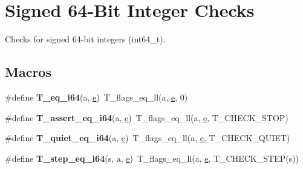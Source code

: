 \hypertarget{group__RTEMSTestFrameworkChecksInt64}{}\section{Signed 64-\/Bit Integer Checks}
\label{group__RTEMSTestFrameworkChecksInt64}


Checks for signed 64-\/bit integers (int64\+\_\+t).  


\subsection*{Macros}
\begin{DoxyCompactItemize}
\item 
\mbox{\label{group__RTEMSTestFrameworkChecksInt64_ga8e664405a7d427a48e6a8df2e3e1a8a1}} 
\#define {\bfseries T\+\_\+eq\+\_\+i64}(a,  \mbox{\hyperlink{sun4u_2tte_8h_a8b0b9ed08e0e18920ec2682f48228c27}{e}})~T\+\_\+flags\+\_\+eq\+\_\+ll(a, \mbox{\hyperlink{sun4u_2tte_8h_a8b0b9ed08e0e18920ec2682f48228c27}{e}}, 0)
\item 
\mbox{\label{group__RTEMSTestFrameworkChecksInt64_ga5d4dc5d93b1cda05c3acf35b4d244d06}} 
\#define {\bfseries T\+\_\+assert\+\_\+eq\+\_\+i64}(a,  \mbox{\hyperlink{sun4u_2tte_8h_a8b0b9ed08e0e18920ec2682f48228c27}{e}})~T\+\_\+flags\+\_\+eq\+\_\+ll(a, \mbox{\hyperlink{sun4u_2tte_8h_a8b0b9ed08e0e18920ec2682f48228c27}{e}}, T\+\_\+\+C\+H\+E\+C\+K\+\_\+\+S\+T\+OP)
\item 
\mbox{\label{group__RTEMSTestFrameworkChecksInt64_ga30e8b3d813466a529e6a0a4e9cb3610b}} 
\#define {\bfseries T\+\_\+quiet\+\_\+eq\+\_\+i64}(a,  \mbox{\hyperlink{sun4u_2tte_8h_a8b0b9ed08e0e18920ec2682f48228c27}{e}})~T\+\_\+flags\+\_\+eq\+\_\+ll(a, \mbox{\hyperlink{sun4u_2tte_8h_a8b0b9ed08e0e18920ec2682f48228c27}{e}}, T\+\_\+\+C\+H\+E\+C\+K\+\_\+\+Q\+U\+I\+ET)
\item 
\mbox{\label{group__RTEMSTestFrameworkChecksInt64_gaba02fe43e46e6c6f6c3f70899710c34f}} 
\#define {\bfseries T\+\_\+step\+\_\+eq\+\_\+i64}(s,  a,  \mbox{\hyperlink{sun4u_2tte_8h_a8b0b9ed08e0e18920ec2682f48228c27}{e}})~T\+\_\+flags\+\_\+eq\+\_\+ll(a, \mbox{\hyperlink{sun4u_2tte_8h_a8b0b9ed08e0e18920ec2682f48228c27}{e}}, T\+\_\+\+C\+H\+E\+C\+K\+\_\+\+S\+T\+EP(s))

\end{DoxyCompactItemize}
